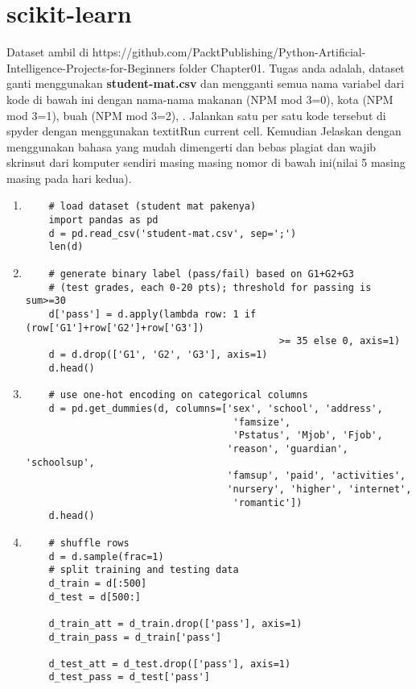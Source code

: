\section{scikit-learn}
Dataset ambil di https://github.com/PacktPublishing/Python-Artificial-Intelligence-Projects-for-Beginners folder Chapter01.
Tugas anda adalah, dataset ganti menggunakan \textbf{student-mat.csv} dan mengganti semua nama variabel dari kode di bawah ini dengan nama-nama makanan (NPM mod 3=0), kota (NPM mod 3=1), buah (NPM mod 3=2), . Jalankan satu per satu kode tersebut di spyder dengan menggunakan textit{Run current cell}. Kemudian Jelaskan dengan menggunakan bahasa yang mudah dimengerti dan bebas plagiat dan wajib skrinsut dari komputer sendiri masing masing nomor di bawah ini(nilai 5 masing masing pada hari kedua).

\begin{enumerate}

\item
\begin{verbatim}
	# load dataset (student mat pakenya)
	import pandas as pd
	d = pd.read_csv('student-mat.csv', sep=';')
	len(d)
\end{verbatim}
\item
\begin{verbatim}
	# generate binary label (pass/fail) based on G1+G2+G3 
	# (test grades, each 0-20 pts); threshold for passing is sum>=30
	d['pass'] = d.apply(lambda row: 1 if (row['G1']+row['G2']+row['G3']) 
											>= 35 else 0, axis=1)
	d = d.drop(['G1', 'G2', 'G3'], axis=1)
	d.head()
\end{verbatim}
\item
\begin{verbatim}
	# use one-hot encoding on categorical columns
	d = pd.get_dummies(d, columns=['sex', 'school', 'address', 
									'famsize', 
									'Pstatus', 'Mjob', 'Fjob', 
	                               'reason', 'guardian', 'schoolsup', 
								   'famsup', 'paid', 'activities',
	                               'nursery', 'higher', 'internet', 
									'romantic'])
	d.head()
\end{verbatim}
\item
\begin{verbatim}
	# shuffle rows
	d = d.sample(frac=1)
	# split training and testing data
	d_train = d[:500]
	d_test = d[500:]

	d_train_att = d_train.drop(['pass'], axis=1)
	d_train_pass = d_train['pass']

	d_test_att = d_test.drop(['pass'], axis=1)
	d_test_pass = d_test['pass']


\end{verbatim}
\end{enumerate}
